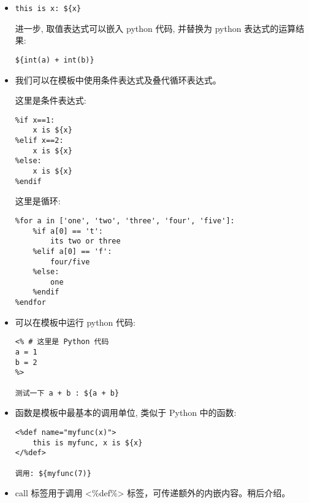 \documentclass{manual}
\begin{document}
\begin{itemize}

\item {}

\begin{verbatim}
this is x: ${x}
\end{verbatim}

进一步, 取值表达式可以嵌入 python 代码, 并替换为 python 表达式的运算结果:

\begin{verbatim}
${int(a) + int(b)}
\end{verbatim}

\item {}

我们可以在模板中使用条件表达式及叠代循环表达式。

这里是条件表达式:

\begin{verbatim}
%if x==1:
	x is ${x}
%elif x==2:
	x is ${x}
%else:
	x is ${x}
%endif
\end{verbatim}

这里是循环:

\begin{verbatim}
%for a in ['one', 'two', 'three', 'four', 'five']:
	%if a[0] == 't':
		its two or three
	%elif a[0] == 'f':
		four/five
	%else:
		one
	%endif
%endfor
\end{verbatim}

\item {}

可以在模板中运行 python 代码:

\begin{verbatim}
<% # 这里是 Python 代码
a = 1
b = 2
%>

测试一下 a + b : ${a + b}
\end{verbatim}


\item {}

函数是模板中最基本的调用单位, 类似于 Python 中的函数:

\begin{verbatim}
<%def name="myfunc(x)">
    this is myfunc, x is ${x}
</%def>

调用: ${myfunc(7)}
\end{verbatim}

\item {}

call 标签用于调用 <\%def\%> 标签，可传递额外的内嵌内容。稍后介绍。

\end{itemize}
\end{document}
